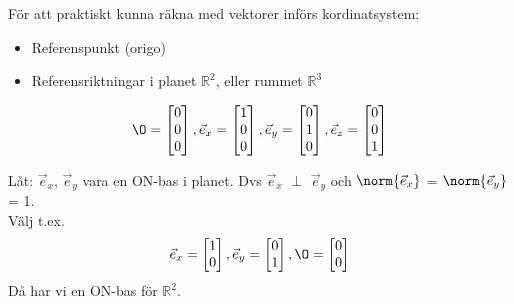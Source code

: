 För att praktiskt kunna räkna med vektorer införs kordinatsystem:
\samepage
\begin{itemize}
  \item Referenspunkt (origo)
  \item Referensriktningar i planet $\mathbb{R}^2$, eller rummet $\mathbb{R}^3$
\end{itemize}
\newpage
\begin{Ex}
\[
    \O = \begin{bmatrix} 0 \\ 0 \\ 0 \end{bmatrix}, \vec{e}_x = \begin{bmatrix} 1 \\ 0 \\ 0 \end{bmatrix}, \vec{e}_y = \begin{bmatrix} 0 \\ 1 \\ 0 \end{bmatrix}, \vec{e}_z = \begin{bmatrix} 0 \\ 0 \\ 1 \end{bmatrix}
\]
\end{Ex}
\noindent
Låt: $\vec{e}_x$, $\vec{e}_y$ vara en ON-bas i planet. Dvs $\vec{e}_x$ $\perp$ $\vec{e}_y$ och  $\norm{\vec{e}_x }$ = $\norm{\vec{e}_y}$ = 1.
\\
\noindent
Välj t.ex.
\[
     \vec{e}_x = \begin{bmatrix} 1 \\ 0 \end{bmatrix}, \vec{e}_y = \begin{bmatrix} 0 \\ 1 \end{bmatrix}, \O = \begin{bmatrix} 0 \\ 0 \end{bmatrix}
 \] Då har vi en ON-bas för $\mathbb{R}^2$.
 
